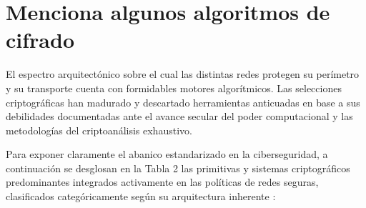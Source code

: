 \documentclass[a4paper,12pt]{article}
\begin{document}
\section{Menciona algunos algoritmos de cifrado}

El espectro arquitectónico sobre el cual las distintas redes protegen su perímetro y su transporte cuenta con formidables motores algorítmicos. Las selecciones criptográficas han madurado y descartado herramientas anticuadas en base a sus debilidades documentadas ante el avance secular del poder computacional y las metodologías del criptoanálisis exhaustivo. 

Para exponer claramente el abanico estandarizado en la ciberseguridad, a continuación se desglosan en la Tabla 2 las primitivas y sistemas criptográficos predominantes integrados activamente en las políticas de redes seguras, clasificados categóricamente según su arquitectura inherente \cite{keyfactor_sym, redes_crypto, encrypt_sym, ibm_crypto_types}:
\end{document}
